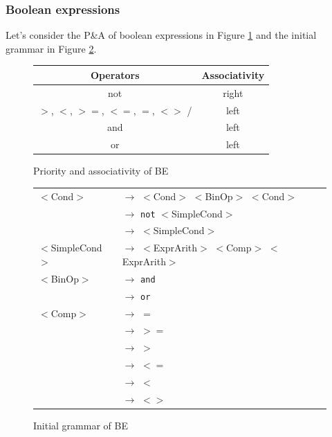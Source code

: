 \documentclass[letterpaper]{article}
\begin{document}
\subsubsection{Boolean expressions}

Let's consider the P\&A of boolean expressions in Figure \ref{fig:BE-pa}
and the initial grammar in Figure \ref{fig:BE-initial}.

\begin{figure}[H]
    \centering
    \begin{tabular}{|c|c|}
        \hline
        Operators & Associativity \\
        \hline
        \hline
        not & right \\
        \hline
        $>$, $<$, $>=$, $<=$, $=$, $<>$ / & left \\
        \hline
        and & left \\
        \hline
        or & left \\
        \hline
    \end{tabular}
    \caption{Priority and associativity of BE}
    \label{fig:BE-pa}
\end{figure}

\begin{figure}[H]
    \centering
    \begin{tabular}{l l}
        $<$Cond$>$ & $\rightarrow$ $<$Cond$>$ $<$BinOp$>$ $<$Cond$>$ \\
         & $\rightarrow$ \texttt{not} $<$SimpleCond$>$\\
         & $\rightarrow$ $<$SimpleCond$>$\\
        $<$SimpleCond$>$ & $\rightarrow$
        $<$ExprArith$>$ $<$Comp$>$ $<$ExprArith$>$ \\
        $<$BinOp$>$ & $\rightarrow$ \texttt{and}\\
         & $\rightarrow$ \texttt{or}\\
        $<$Comp$>$ & $\rightarrow$ $=$\\
         & $\rightarrow$ $>=$\\
         & $\rightarrow$ $>$\\
         & $\rightarrow$ $<=$\\
         & $\rightarrow$ $<$\\
         & $\rightarrow$ $<>$\\
    \end{tabular}
    \caption{Initial grammar of BE}
    \label{fig:BE-initial}

\end{figure}
\end{document}
